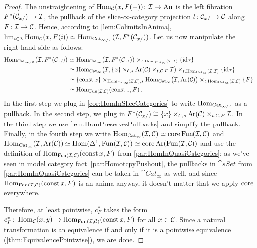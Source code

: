 \begin{proof}
	The unstraightening of $\operatorname{Hom}_{\mathcal{C}}(x,F(-))\colon \mathcal{I}\rightarrow\mathrm{An}$ is the left fibration $F^*(\mathcal{C}_{x/})\rightarrow \mathcal{I}$, the pullback of the slice-$\infty$-category projection $t\colon \mathcal{C}_{x/}\rightarrow \mathcal{C}$ along $F\colon \mathcal{I}\rightarrow\mathcal{C}$. Hence, according to \cref{lem:ColimitsInAnima}, $\operatorname*{lim}_{i\in\mathcal{I}}\operatorname{Hom}_{\mathcal{C}}(x,F(i))\simeq\operatorname{Hom}_{\mathrm{Cat}_{\infty/\mathcal{I}}}(\mathcal{I},F^*(\mathcal{C}_{x/}))$. Let us now manipulate the right-hand side as follows:
	\begin{align*}
		\Hom_{\Cat_{\infty/\Ii}}\bigl(\Ii,F^*(\Cc_{x/})\bigr)&\simeq \Hom_{\cat{Cat}_\infty}\bigl(\Ii,F^*(\Cc_{x/})\bigr)\times_{t,\Hom_{\cat{Cat}_\infty}(\Ii,\Ii)}\{\id_\Ii\}\\%
		&\simeq \Hom_{\cat{Cat}_\infty}\bigl(\Ii,\{x\}\times_{\Cc,s}\Ar(\Cc)\times_{t,\Cc,F}\Ii\bigr)\times_{t,\Hom_{\cat{Cat}_\infty}(\Ii,\Ii)}\{\id_\Ii\}\\
		&\simeq \{\const x\}\times_{\Hom_{\cat{Cat}_\infty}(\Ii,\Cc),s}\Hom_{\cat{Cat}_\infty}\bigl(\Ii,\Ar(\Cc)\bigr)\times_{t,\Hom_{\cat{Cat}_\infty}(\Ii,\Cc)}\{F\}\\
		&\simeq \Hom_{\Fun(\Ii,\Cc)}(\const x,F)\,.
	\end{align*}
	In the first step we plug in \cref{cor:HomInSliceCategories} to write $\operatorname{Hom}_{\mathrm{Cat}_{\infty/\mathcal{I}}}$ as a pullback. In the second step, we plug in $F^*(\mathcal{C}_{x/})\cong\{x\}\times_{\mathcal{C},s}\operatorname{Ar}(\mathcal{C})\times_{t,\mathcal{C},F}\mathcal{I}$. In the third step we use \cref{lem:HomPreservesPullbacks} and simplify the pullback. Finally, in the fourth step we write $\operatorname{Hom}_{\mathrm{Cat}_\infty}(\mathcal{I},\mathcal{C})\simeq \operatorname{core} \operatorname{Fun}(\mathcal{I},\mathcal{C})$ and $\operatorname{Hom}_{\mathrm{Cat}_\infty}(\mathcal{I},\operatorname{Ar}(\mathcal{C}))\simeq \operatorname{Hom}(\Delta^1,\operatorname{Fun}(\mathcal{I},\mathcal{C}))\simeq \operatorname{core}\operatorname{Ar}(\operatorname{Fun}(\mathcal{I},\mathcal{C}))$ and use the definition of $\operatorname{Hom}_{\operatorname{Fun}(\mathcal{I},\mathcal{C})}(\operatorname{const} x,F)$ from \cref{par:HomInQuasiCategories}; as we've seen in model category fact~\cref{par:HomotopyPushout}, the pullbacks in $\cat{sSet}$ from \cref{par:HomInQuasiCategories} can be taken in $\cat{Cat}_\infty$ as well, and since $\operatorname{Hom}_{\operatorname{Fun}(\mathcal{I},\mathcal{C})}(\operatorname{const} x,F)$ is an anima anyway, it doesn't matter that we apply $\operatorname{core}$ everywhere.
	
	Therefore, at least pointwise, $c_F^*$ takes the form $c_F^*\colon \operatorname{Hom}_{\mathcal{C}}(x,y)\rightarrow \operatorname{Hom}_{\operatorname{Fun}(\mathcal{I},\mathcal{C})}(\operatorname{const} x,F)$ for all $x\in\mathcal{C}$. Since a natural transformation is an equivalence if and only if it is a pointwise equivalence (\cref{thm:EquivalencePointwise}), we are done.
\end{proof}
